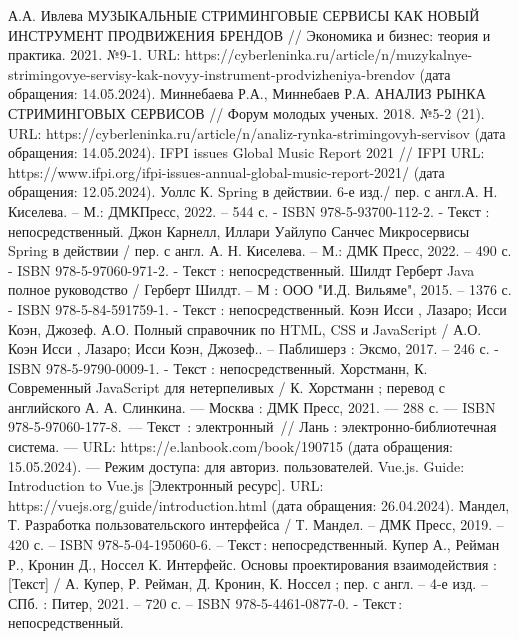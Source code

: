
\begin{thebibliography}{9}
     А.А. Ивлева МУЗЫКАЛЬНЫЕ СТРИМИНГОВЫЕ СЕРВИСЫ КАК НОВЫЙ ИНСТРУМЕНТ ПРОДВИЖЕНИЯ БРЕНДОВ // Экономика и бизнес: теория и практика. 2021. №9-1. URL: https://cyberleninka.ru/article/n/muzykalnye-strimingovye-servisy-kak-novyy-instrument-prodvizheniya-brendov (дата обращения: 14.05.2024).
	 Миннебаева Р.А., Миннебаев Р.А. АНАЛИЗ РЫНКА СТРИМИНГОВЫХ СЕРВИСОВ // Форум молодых ученых. 2018. №5-2 (21). URL: https://cyberleninka.ru/article/n/analiz-rynka-strimingovyh-servisov (дата обращения: 14.05.2024).
	 IFPI issues Global Music Report 2021 // IFPI URL: https://www.ifpi.org/ifpi-issues-annual-global-music-report-2021/ (дата обращения: 12.05.2024).
      Уоллс К. Spring в действии. 6-е изд./ пер. с англ.А. Н. Киселева. – М.: ДМКПресс, 2022. – 544 с. - ISBN 978-5-93700-112-2. - Текст : непосредственный.
     Джон Карнелл, Иллари Уайлупо Санчес Микросервисы Spring в действии / пер. с англ. А. Н. Киселева. – М.: ДМК Пресс, 2022. – 490 с. - ISBN 978-5-97060-971-2. - Текст : непосредственный.
     Шилдт Герберт Java полное руководство / Герберт Шилдт. – М : ООО "И.Д. Вильяме", 2015. – 1376 с. - ISBN 978-5-84-591759-1. - Текст : непосредственный.
     Коэн Исси , Лазаро; Исси Коэн, Джозеф. А.О. Полный справочник по HTML, CSS и JavaScript / А.О. Коэн Исси , Лазаро; Исси Коэн, Джозеф.. – Паблишерз : Эксмо, 2017. – 246 с. - ISBN 978-5-9790-0009-1. - Текст : непосредственный.
     Хорстманн, К. Современный JavaScript для нетерпеливых / К. Хорстманн ; перевод с английского А. А. Слинкина. — Москва : ДМК Пресс, 2021. — 288 с. — ISBN 978-5-97060-177-8. — Текст : электронный // Лань : электронно-библиотечная система. — URL: https://e.lanbook.com/book/190715 (дата обращения: 15.05.2024). — Режим доступа: для авториз. пользователей.
     Vue.js. Guide: Introduction to Vue.js [Электронный ресурс]. URL: https://vuejs.org/guide/introduction.html (дата обращения: 26.04.2024).
     Мандел, Т. Разработка пользовательского интерфейса / Т. Мандел. – ДМК Пресс, 2019. – 420 с. – ISBN 978-5-04-195060-6. – Текст : непосредственный.
     Купер А., Рейман Р., Кронин Д., Носсел К. Интерфейс. Основы проектирования взаимодействия : [Текст] / А. Купер, Р. Рейман, Д. Кронин, К. Носсел ; пер. с англ. – 4-е изд. – СПб. : Питер, 2021. – 720 с. – ISBN 978-5-4461-0877-0. - Текст : непосредственный.

\end{thebibliography}
